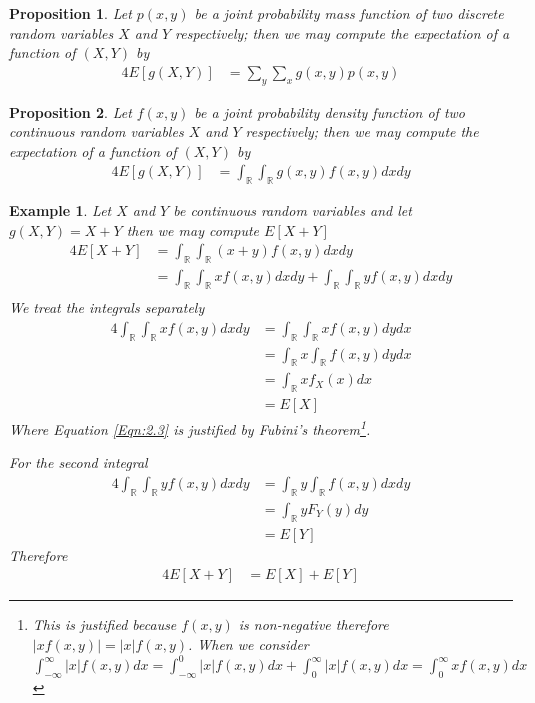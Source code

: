 \documentclass[11pt, oneside]{book}   	%
\newtheorem{example}{Example}[chapter]
\newtheorem{proposition}{Proposition}[chapter]
\begin{document}
\begin{proposition}
	Let $p(x, y)$ be a joint probability mass function of two discrete random variables $X$ and $Y$ respectively; then we may compute the expectation of a function of $(X, Y)$ by 
	\begin{alignat}{4}
		E[g(X, Y)]&=\sum_y\sum_xg(x, y)p(x, y)
	\end{alignat}
\end{proposition}

\begin{proposition}
	Let $f(x, y)$ be a joint probability density function of two continuous random variables $X$ and $Y$ respectively; then we may compute the expectation of a function of $(X, Y)$ by 
	\begin{alignat}{4}
		E[g(X, Y)]&=\int_\mathbb{R}\int_\mathbb{R}g(x, y)f(x, y)dx dy
	\end{alignat}
\end{proposition}

\begin{example}
	Let $X$ and $Y$ be continuous random variables and let $g(X, Y)=X+Y$ then we may compute $E[X+Y]$
	\begin{alignat}{4}
		E[X+Y]&=\int_\mathbb{R}\int_\mathbb{R} (x+y)f(x, y)dxdy \\
			&=\int_\mathbb{R}\int_\mathbb{R} xf(x, y)dx dy + \int_\mathbb{R}\int_\mathbb{R} yf(x, y)dx dy \\
	\end{alignat}
	We treat the integrals separately 
	\begin{alignat}{4}
		\int_\mathbb{R}\int_\mathbb{R} xf(x, y) dx dy &=\int_\mathbb{R}\int_\mathbb{R} x f(x, y) dy dx \label{Eqn:2.3} \\
			&=\int_\mathbb{R} x \int_\mathbb{R} f(x, y) dy dx \\
			&=\int_\mathbb{R} x f_X(x) dx \\
			&= E[X]
	\end{alignat}
	Where Equation \ref{Eqn:2.3} is justified by Fubini's theorem\footnote{This is justified because $f(x, y)$ is non-negative therefore $\left|x f(x, y)\right| = |x|f(x, y)$. When we consider $\int_{-\infty}^\infty |x|f(x, y)dx=\int_{-\infty}^0|x|f(x, y)dx + \int_0^\infty|x|f(x, y)dx=\int_0^\infty xf(x, y)dx$}. 
	
	For the second integral 
	\begin{alignat}{4}
		\int_\mathbb{R}\int_\mathbb{R} yf(x, y) dx dy &=\int_\mathbb{R} y \int_\mathbb{R} f(x, y) dx dy \\
			&= \int_\mathbb{R} y F_Y(y) dy \\
			&= E[Y]
	\end{alignat}
	Therefore
	\begin{alignat}{4}
		E[X+Y] &= E[X] + E[Y]
	\end{alignat}
	
\end{example}
\end{document}

